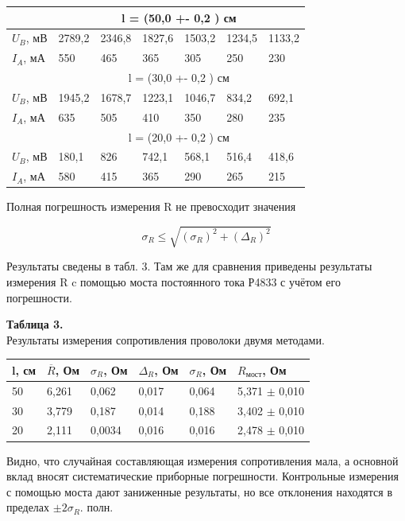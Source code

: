 \begin{table}[h]
\centering
\begin{tabular}{|l|l|l|l|l|l|l|}
\hline
      & \multicolumn{6}{c|}{l = (50,0 +- 0,2 ) см}          \\ \hline
$U_B$, мВ & 2789,2 & 2346,8 & 1827,6 & 1503,2 & 1234,5 & 1133,2 \\ \hline
$I_A$, мА & 550    & 465    & 365    & 305    & 250    & 230    \\ \hline
      & \multicolumn{6}{c|}{l = (30,0 +- 0,2 ) см}          \\ \hline
$U_B$, мВ & 1945,2 & 1678,7 & 1223,1 & 1046,7 & 834,2  & 692,1  \\ \hline
$I_A$, мА & 635    & 505    & 410    & 350    & 280    & 235    \\ \hline
      & \multicolumn{6}{c|}{l = (20,0 +- 0,2 ) см}          \\ \hline
$U_B$, мВ & 180,1  & 826    & 742,1  & 568,1  & 516,4  & 418,6  \\ \hline
$I_A$, мА & 580    & 415    & 365    & 290    & 265    & 215    \\ \hline
\end{tabular}
\end{table}




Полная погрешность измерения R не превосходит значения 


\[\sigma{_{R}} \leq \sqrt{(\sigma_{R})^2 + (\Delta_{R})^2}\]


Результаты сведены в табл. 3. Там же для сравнения приведены результаты измерения R c помощью моста постоянного тока Р4833 с учётом его погрешности.
\begin{flushright}
{\scriptsize \textbf{Таблица 3.}\\Результаты измерения сопротивления проволоки двумя методами.}
\end{flushright}


\begin{table}[h!]
\centering
\begin{tabular}{|l|l|l|l|l|l|}
\hline
l, см & $\overline R$, Ом & $\sigma_R$, Ом & $\Delta_R$, Ом & $\sigma_R$, Ом & $R_{мост}$, Ом                  \\ \hline
50    & 6,261            & 0,062          & 0,017          & 0,064          & 5,371 $\pm$ 0,010 \\ \hline
30    & 3,779            & 0,187          & 0,014          & 0,188          & 3,402 $\pm$ 0,010  \\ \hline
20    & 2,111            & 0,0034         & 0,016          & 0,016          & 2,478 $\pm$ 0,010  \\ \hline
\end{tabular}
\end{table}
Видно, что случайная составляющая измерения сопротивления мала, а основной вклад вносят систематические приборные погрешности. Контрольные измерения с помощью моста дают заниженные результаты, но все отклонения находятся в пределах $\pm 2 \sigma_{R}$.
полн.


